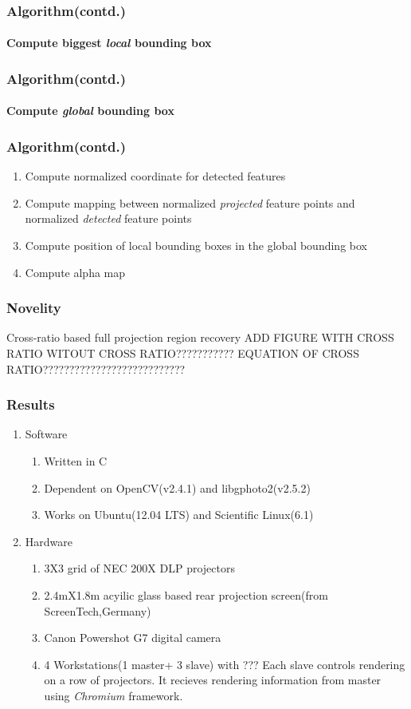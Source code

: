 \documentclass{beamer}
\begin{document}
\begin{frame}
\frametitle{Algorithm(contd.)}
\framesubtitle{Compute biggest \textit{local} bounding box}
\end{frame}


\begin{frame}
\frametitle{Algorithm(contd.)}
\framesubtitle{Compute \textit{global} bounding box}
\end{frame}

\begin{frame}
\frametitle{Algorithm(contd.)}
\begin{enumerate}
\item Compute normalized coordinate for detected features
\item Compute mapping between normalized \textit{projected} feature points and normalized \textit{detected} feature points
\item Compute position of local bounding boxes in the global bounding box
\item Compute alpha map
\end{enumerate}
\end{frame}

\begin{frame}
\frametitle{Novelity}
Cross-ratio based full projection region recovery
ADD FIGURE WITH CROSS RATIO WITOUT CROSS RATIO???????????
EQUATION OF CROSS RATIO???????????????????????????
\end{frame}

\begin{frame}
\frametitle{Results}
\begin{enumerate}
\item Software
\begin{enumerate}
\item Written in C
\item Dependent on OpenCV(v2.4.1) and libgphoto2(v2.5.2)
\item Works on Ubuntu(12.04 LTS) and Scientific Linux(6.1)
\end{enumerate}      
\item Hardware
\begin{enumerate}
\item 3X3 grid of NEC 200X DLP projectors
\item 2.4mX1.8m acyilic glass based rear projection screen(from ScreenTech,Germany)
\item Canon Powershot G7 digital camera
\item 4 Workstations(1 master+ 3 slave) with ???\newline
Each slave controls rendering on a row of projectors. It recieves rendering information from master using \textit{Chromium} framework.
\end{enumerate}
\end{enumerate}
\end{frame}
\end{document}
